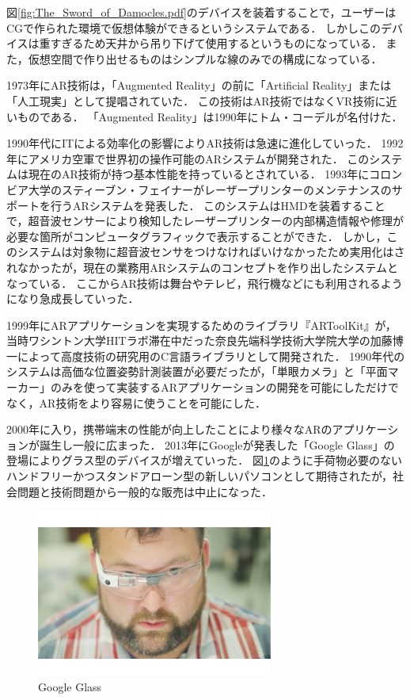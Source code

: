 \documentclass[12pt,a4j]{ltjsarticle}
\begin{document}
図\ref{fig:The_Sword_of_Damocles.pdf}のデバイスを装着することで，ユーザーはCGで作られた環境で仮想体験ができるというシステムである．
しかしこのデバイスは重すぎるため天井から吊り下げて使用するというものになっている．
また，仮想空間で作り出せるものはシンプルな線のみでの構成になっている．

1973年にAR技術は，「Augmented Reality」の前に「Artificial Reality」または「人工現実」として提唱されていた．
この技術はAR技術ではなくVR技術に近いものである．
「Augmented Reality」は1990年にトム・コーデルが名付けた．

1990年代にITによる効率化の影響によりAR技術は急速に進化していった．
1992年にアメリカ空軍で世界初の操作可能のARシステムが開発された．
このシステムは現在のAR技術が持つ基本性能を持っているとされている．
1993年にコロンビア大学のスティーブン・フェイナーがレーザープリンターのメンテナンスのサポートを行うARシステムを発表した．
このシステムはHMDを装着することで，超音波センサーにより検知したレーザープリンターの内部構造情報や修理が必要な箇所がコンピュータグラフィックで表示することができた．
しかし，このシステムは対象物に超音波センサをつけなければいけなかったため実用化はされなかったが，現在の業務用ARシステムのコンセプトを作り出したシステムとなっている．
ここからAR技術は舞台やテレビ，飛行機などにも利用されるようになり急成長していった．

1999年にARアプリケーションを実現するためのライブラリ『ARToolKit』が，当時ワシントン大学HITラボ滞在中だった奈良先端科学技術大学院大学の加藤博一によって高度技術の研究用のC言語ライブラリとして開発された．
1990年代のシステムは高価な位置姿勢計測装置が必要だったが，「単眼カメラ」と「平面マーカー」のみを使って実装するARアプリケーションの開発を可能にしただけでなく，AR技術をより容易に使うことを可能にした．

2000年に入り，携帯端末の性能が向上したことにより様々なARのアプリケーションが誕生し一般に広まった．
2013年にGoogleが発表した「Google Glass」の登場によりグラス型のデバイスが増えていった．
図\ref{fig:Google_Glass.pdf}のように手荷物必要のないハンドフリーかつスタンドアローン型の新しいパソコンとして期待されたが，社会問題と技術問題から一般的な販売は中止になった\cite{ARの歴史}．

\begin{figure}[h]
\begin{center}
 \includegraphics[clip,height=55mm]{Google_Glass.pdf}
\end{center}
 \caption{Google Glass}
 \label{fig:Google_Glass.pdf}
\end{figure}
\end{document}
